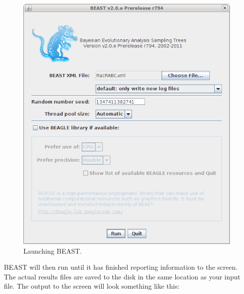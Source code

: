 \documentclass{article}
\begin{document}
\begin{figure}
\begin{center}

\includegraphics[scale=0.5]{figures/BEAST}

\end{center}
\caption{\label{fig.BEAST} Launching BEAST.}
\end{figure}


BEAST will then run until it has finished
reporting information to the screen. The actual results files are
saved to the disk in the same location as your input file. The output to the screen will
look something like this: 
\end{document}

